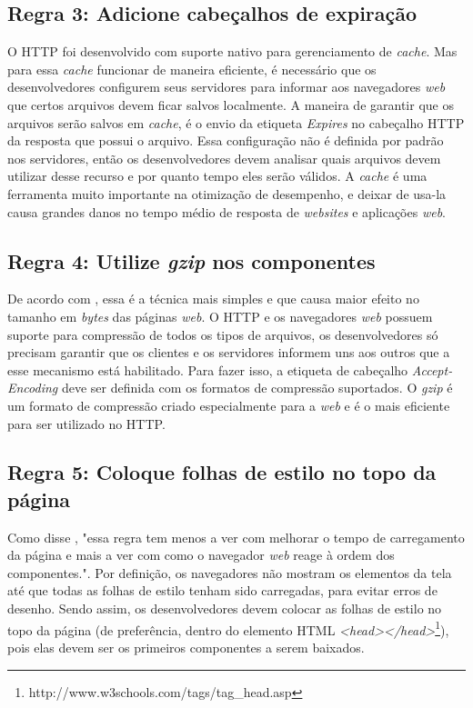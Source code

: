 \subsection{Regra 3: Adicione cabeçalhos de expiração}
\label{subsec:highperformance_regra3}
O HTTP foi desenvolvido com suporte nativo para gerenciamento de \textit{cache}. Mas para essa \textit{cache} funcionar de maneira eficiente, é necessário que os desenvolvedores configurem seus servidores para informar aos navegadores \textit{web} que certos arquivos devem ficar salvos localmente. A maneira de garantir que os arquivos serão salvos em \textit{cache}, é o envio da etiqueta \textit{Expires} no cabeçalho HTTP da resposta que possui o arquivo. Essa configuração não é definida por padrão nos servidores, então os desenvolvedores devem analisar quais arquivos devem utilizar desse recurso e por quanto tempo eles serão válidos. A \textit{cache} é uma ferramenta muito importante na otimização de desempenho, e deixar de usa-la causa grandes danos no tempo médio de resposta de \textit{websites} e aplicações \textit{web}.

\subsection{Regra 4: Utilize \textit{gzip} nos componentes}
\label{subsec:highperformance_regra4}
De acordo com , essa é a técnica mais simples e que causa maior efeito no tamanho em \textit{bytes} das páginas \textit{web}. O HTTP e os navegadores \textit{web} possuem suporte para compressão de todos os tipos de arquivos, os desenvolvedores só precisam garantir que os clientes e os servidores informem uns aos outros que a esse mecanismo está habilitado. Para fazer isso, a etiqueta de cabeçalho \textit{Accept-Encoding} deve ser definida com os formatos de compressão suportados. O \textit{gzip} é um formato de compressão criado especialmente para a \textit{web} e é o mais eficiente para ser utilizado no HTTP.

\subsection{Regra 5: Coloque folhas de estilo no topo da página}
\label{subsec:highperformance_regra5}
Como disse , "essa regra tem menos a ver com melhorar o tempo de carregamento da página e mais a ver com como o navegador \textit{web} reage à ordem dos componentes.". Por definição, os navegadores não mostram os elementos da tela até que todas as folhas de estilo tenham sido carregadas, para evitar erros de desenho. Sendo assim, os desenvolvedores devem colocar as folhas de estilo no topo da página (de preferência, dentro do elemento HTML \textit{<head></head>}\footnote{http://www.w3schools.com/tags/tag\_head.asp}), pois elas devem ser os primeiros componentes a serem baixados.


